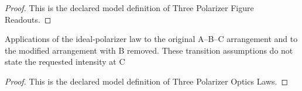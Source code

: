 \begin{proof}
  This is the declared model definition of Three Polarizer Figure Readouts.
\end{proof}
\begin{definition}
  \label{def:physics:phyx-mini-0093:phyxminiproblems-problemphyxmini0093-threepolarizeropticslaws}
  Applications of the ideal-polarizer law to the original A--B--C arrangement and to the modified arrangement with B removed. These transition assumptions do not state the requested intensity at C
\end{definition}
\begin{proof}
  This is the declared model definition of Three Polarizer Optics Laws.
\end{proof}
